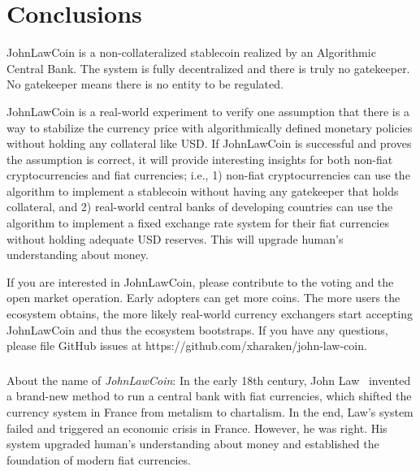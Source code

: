 \documentclass[dvipdfmx,a4paper]{article}
\begin{document}
\section{Conclusions}

JohnLawCoin is a non-collateralized stablecoin realized by an Algorithmic Central Bank. The system is fully decentralized and there is truly no gatekeeper. No gatekeeper means there is no entity to be regulated.

JohnLawCoin is a real-world experiment to verify one assumption that there is a way to stabilize the currency price with algorithmically defined monetary policies without holding any collateral like USD. If JohnLawCoin is successful and proves the assumption is correct, it will provide interesting insights for both non-fiat cryptocurrencies and fiat currencies; i.e., 1) non-fiat cryptocurrencies can use the algorithm to implement a stablecoin without having any gatekeeper that holds collateral, and 2) real-world central banks of developing countries can use the algorithm to implement a fixed exchange rate system for their fiat currencies without holding adequate USD reserves. This will upgrade human's understanding about money.

If you are interested in JohnLawCoin, please contribute to the voting and the open market operation. Early adopters can get more coins. The more users the ecosystem obtains, the more likely real-world currency exchangers start accepting JohnLawCoin and thus the ecosystem bootstraps. If you have any questions, please file GitHub issues at https://github.com/xharaken/john-law-coin.

\subsubsection*{}

About the name of \textit{JohnLawCoin}: In the early 18th century, John Law~\cite{davies2010history,ferguson2008ascent,iwai1997evolution} invented a brand-new method to run a central bank with fiat currencies, which shifted the currency system in France from metalism to chartalism. In the end, Law's system failed and triggered an economic crisis in France. However, he was right. His system upgraded human's understanding about money and established the foundation of modern fiat currencies.



\end{document}
